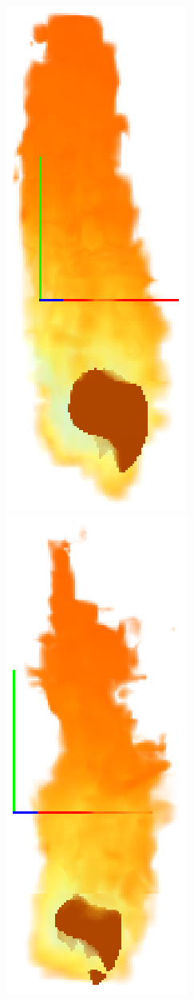 \documentclass[a4paper,10pt]{article}
\begin{document}
\begin{center}
	\includegraphics[scale=0.6]{Decomposition3.ps}\\
	\includegraphics[scale=0.6]{Decomposition4.ps}

\end{center}
\end{document}
